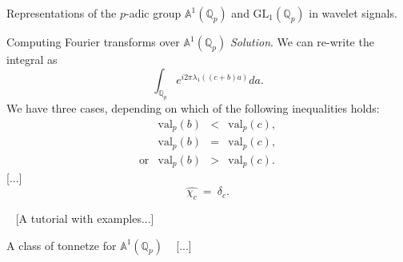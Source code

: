 \documentclass[letterpaper,11pt, reqno]{amsart}
\newtheorem{monodromy theorem}{Monodromy Theorem}[subsection]
\newtheorem{wild conjecture}[theorem]{Wild Conjecture}
\newtheorem{research objectives}{Research objectives}[subsection]
\newtheorem{research question}[theorem]{Research questions}
\newtheorem{aside question}[theorem]{Aside question}
\newtheorem{audio example}[theorem]{\loudspeaker[3] Example}
\newtheorem{blank remark}[theorem]{}
\newtheorem{terminology and comment}[theorem]{Terminology and comment}
\newtheorem{purity hypothesis}[theorem]{Purity hypothesis}
\newtheorem{corollary of the purity hypothesis}[theorem]{Corollary of the purity hypothesis}
\newcommand{\QQ} {{\mathbb Q}}
\numberwithin{equation}{theorem}
\begin{document}
\begin{section}{Representations of the $p$-adic group $\mathbb{A}^{\!1}(\mathbb{Q}_{p})$
and $\text{GL}_{1}(\mathbb{Q}_{p})$
in wavelet signals.}
\begin{subsection}{Computing Fourier transforms over $\mathbb{A}^{\!1}(\QQ_{p})$}
\noindent
{\em Solution}.
We can re-write the integral as
	$$
	\int_{\QQ_{p}}\!\!\!e^{i2\pi\lambda_{1\!}((c+b)a)}da.
	$$
We have three cases, depending on which of the following inequalities holds:
	$$
	\begin{array}{rrcl}
	& \text{val}_{p}(b) & \!\!<\!\! & \text{val}_{p}(c),
	\\[10pt]
	& \text{val}_{p}(b) & \!\!=\!\! & \text{val}_{p}(c),
	\\[10pt]
	\text{or}
	& \text{val}_{p}(b) & \!\!>\!\! & \text{val}_{p}(c).
	\end{array}
	$$
{\color{red} [...]}
	$$
	\widehat{\chi_{c}}
	\ =\ 
	\delta_{c}.
	$$


\ 
{\color{red} [A tutorial with examples...]}
\end{subsection}

\begin{subsection}{A class of tonnetze for $\mathbb{A}^{\!1}(\QQ_{p})$}
\ 
{\color{red} [...]}
\end{subsection}


\end{section}
\end{document}

